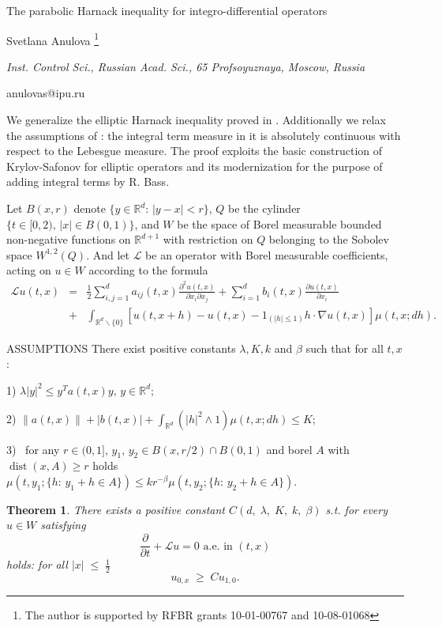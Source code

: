 \documentclass[10pt,a4paper]{article}
\newtheorem{theorem}{Theorem}
\begin{document}
\begin{center}

{\Large The parabolic Harnack
inequality for integro-differential
operators}

\bigskip

{\sc Svetlana Anulova} \footnote{The
author is supported by RFBR grants
10-01-00767 and 10-08-01068}

{\small\it Inst. Control Sci., Russian
Acad. Sci., 65 Profsoyuznaya, Moscow,
Russia}

{\small\rm anulovas@ipu.ru}


\bigskip


\end{center}

\bigskip

We generalize the elliptic Harnack
inequality proved in \cite{F}.
Additionally we relax the assumptions
of \cite{F}: the integral term measure
in it is absolutely continuous with
respect to the Lebesgue measure. The
proof exploits the basic construction
of Krylov-Safonov for elliptic
operators and its modernization for the
purpose of adding integral terms by R.
Bass.

Let $B(x,r)$ denote $\{y\in \mathbb
R^d:\,|y-x|< r\}$,\; $Q$\; be the
cylinder $\{t\in [0,2),\, |x|\in
B(0,1)\}$, and $W$ be the space of
Borel measurable bounded non-negative
functions on $\mathbb R^{d+1}$ with
restriction on $Q$ belonging to the
Sobolev space $W^{1,2}(Q)$. And let
$\mathcal L$ be an operator with Borel
measurable coefficients, acting on
$u\in W$
 according to the formula
\begin{eqnarray}%
{\mathcal L}
u(t,x)&=&\frac{1}{2}\sum_{i,j=1}^d
a_{ij}(t,x)\frac{\partial^2u(t,x)}{\partial
x_i\partial x_j}+\sum_{i=1}^d
b_i(t,x)\frac{\partial u(t,x)}{\partial
x_i} \nonumber\\
&+&\int_{{\mathbb
R}^d\backslash\{0\}}[u(t,x+h)-u(t,x)-1_{(|h|\leq1)}h\cdot
\nabla u(t,x)]\mu(t,x;dh).\nonumber
\end{eqnarray}




ASSUMPTIONS There exist positive
constants $\lambda,K,k$ and $\beta$
such that for all $t,x$:

  1) $\lambda
|y|^2 \leq y^T a(t,x)y, \, y\in
{\mathbb R}^d;$

 2) $\|a(t,x)\|+|b(t,x)| + \int_{{\mathbb
R}^d}(|h|^2\wedge 1)\mu(t,x;dh)\leq K;$

 3)~ for any $r\in(0,1]$, $y_1,\,y_2\in
B(x,r/2)\cap B(0,1)$ and borel $A$ with
$\mathop{\mathrm {dist}}\nolimits
(x,A)\ge r$ holds $\mu(t,y_1;\{h:\,
y_1+h\in A\})\leq
kr^{-\beta}\mu(t,y_2;\{h:\, y_2+h\in
A\})$.
\begin{theorem}
There exists a positive constant
$C(d,\;\lambda,\;K,\;k,\; \beta)$ s.t.
for every $u\in W$ satisfying
\[\frac{\partial}{\partial t} + \mathcal
Lu=0 \mbox{ a.e. in }(t,x)\] holds: for
all $|x|\;\le\;\frac{1}{2}$
\[u_{0,x}\;\ge\;Cu_{1,0}.\]
\end{theorem}
\end{document}
